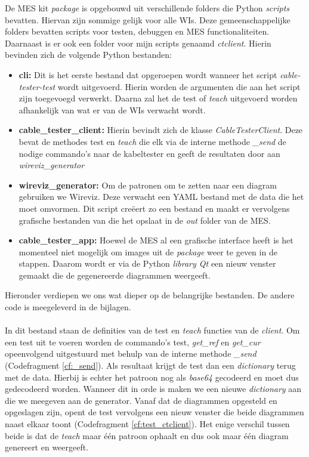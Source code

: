 De \gls{MES} kit \textit{package} is opgebouwd uit verschillende folders die Python \textit{scripts} bevatten. Hiervan zijn sommige gelijk voor alle \glspl{WI}. Deze gemeenschappelijke folders bevatten scripts voor testen, debuggen en \gls{MES} functionaliteiten. Daarnaast is er ook een folder voor mijn scripts genaamd \textit{ctclient}. Hierin bevinden zich de volgende Python bestanden:

\begin{itemize}[]
    \item \textbf{cli:} Dit is het eerste bestand dat opgeroepen wordt wanneer het script \textit{cable-tester-test} wordt uitgevoerd. Hierin worden de argumenten die aan het script zijn toegevoegd verwerkt. Daarna zal het de test of \textit{teach} uitgevoerd worden afhankelijk van wat er van de \glspl{WI} verwacht wordt.
    \item \textbf{cable\_tester\_client:} Hierin bevindt zich de klasse \textit{CableTesterClient}. Deze bevat de methodes test en \textit{teach} die elk via de interne methode \textit{\_send} de nodige commando's naar de kabeltester en geeft de resultaten door aan \textit{wireviz\_generator}
    \item \textbf{wireviz\_generator:} Om de patronen om te zetten naar een diagram gebruiken we Wireviz. Deze verwacht een \gls{YAML} bestand met de data die het moet omvormen. Dit script creëert zo een bestand en maakt er vervolgens grafische bestanden van die het opslaat in de \textit{out} folder van de \gls{MES}. 
    \item \textbf{cable\_tester\_app:} Hoewel de \gls{MES} al een grafische interface heeft is het momenteel niet mogelijk om images uit de \textit{package} weer te geven in de stappen. Daarom wordt er via de Python \textit{library Qt} een nieuw venster gemaakt die de gegenereerde diagrammen weergeeft. 
\end{itemize}

Hieronder verdiepen we ons wat dieper op de belangrijke bestanden. De andere code is meegeleverd in de bijlagen. 

\paragraph{}%

In dit bestand staan de definities van de test en \textit{teach} functies van de \textit{client}. Om een test uit te voeren worden de commando's test, \textit{get\_ref} en \textit{get\_cur} opeenvolgend uitgestuurd met behulp van de interne methode \textit{\_send} (Codefragment \ref{cf:_send}). Als resultaat krijgt de test dan een \textit{dictionary} terug met de data. Hierbij is echter het patroon nog als \textit{base64} gecodeerd en moet dus gedecodeerd worden. Wanneer dit in orde is maken we een nieuwe \textit{dictionary} aan die we meegeven aan de generator. Vanaf dat de diagrammen opgesteld en opgeslagen zijn, opent de test vervolgens een nieuw venster die beide diagrammen naast elkaar toont (Codefragment \ref{cf:test_ctclient}). Het enige verschil tussen beide is dat de \textit{teach} maar één patroon ophaalt en dus ook maar één diagram genereert en weergeeft. 

